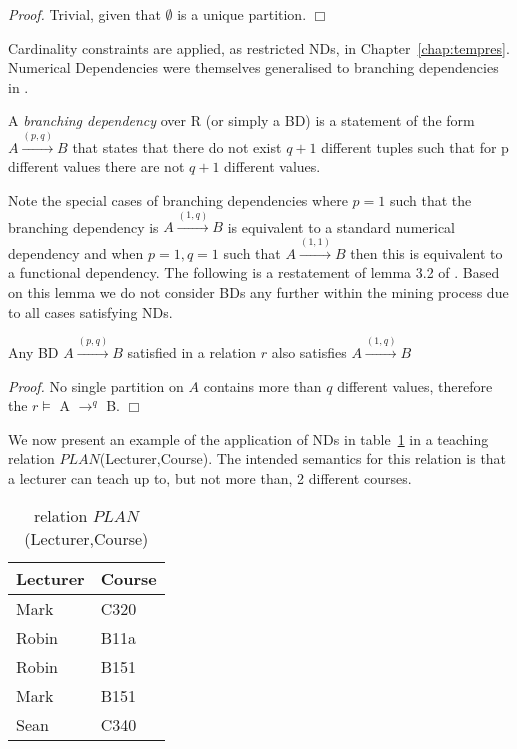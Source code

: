 {\em Proof.} Trivial, given that $\emptyset$ is a unique
partition. $\Box$

Cardinality constraints are applied, as restricted NDs, in
Chapter~\ref{chap:tempres}. Numerical Dependencies were themselves generalised to branching
dependencies in \cite{dks92}. 
\medskip

\begin{definition}
\begin{rm}
A {\em branching dependency} over R (or simply a BD)
is a statement of the form $A \stackrel{(p,q)}{\rightarrow} B$ that
states that  there do not exist $q+1$ different tuples such that for
p different values there are not $q+1$ different values. 
\end{rm}
\end{definition}

Note the special  cases of branching dependencies
where $p = 1$ such that the branching dependency is  $A 
\stackrel{(1,q)}{\rightarrow} B$
is equivalent to a standard numerical dependency and when
$ p = 1, q = 1$ such that  $A \stackrel{(1,1)}{\rightarrow} B$ then
this is equivalent to a functional dependency. The following is a
restatement of lemma 3.2 of \cite{dks92}. Based on this lemma we do
not consider BDs any further within the mining process due to all
cases satisfying NDs.

\begin{lemma}\label{rev:lem_bd}
\begin{rm}
Any BD $A \stackrel{(p,q)}{\rightarrow} B$ satisfied in a relation $r$
also satisfies $A \stackrel{(1,q)}{\rightarrow} B$
\end{rm}
\end{lemma}

{\em Proof.} No single partition on $A$ contains more than $q$
different values, therefore the $r \models$ A $\to^q$ B. $\Box$


We now present an
example of the application of NDs in table~\ref{tbl:1.0}  in a
teaching relation $PLAN$(Lecturer,Course).  The intended semantics for
this relation is that a lecturer can teach up to, but not more than, 2
different courses. 
 
\begin{table}[ht]
\begin{center}
\begin{tabular}{||l|l||} \hline
Lecturer & Course \\ \hline
 Mark &  C320 \\
 Robin & B11a \\
 Robin & B151 \\ 
 Mark  & B151 \\ 
 Sean  & C340 \\ \hline
\end{tabular}
\end{center}
\caption{\label{tbl:1.0} relation $PLAN$(Lecturer,Course)} 
\end{table}


